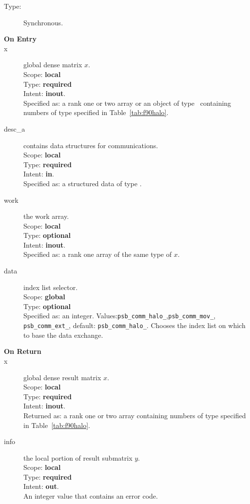 \begin{description}
\item[Type:] Synchronous.
\item[\bf On Entry]
\item[x] global dense matrix $x$.\\
Scope: {\bf local} \\
Type: {\bf required} \\
Intent: {\bf inout}.\\
Specified as:  a rank one or two array or an object of type \vdata\ 
containing numbers of type specified in
Table~\ref{tab:f90halo}.
\item[desc\_a] contains data structures for communications.\\
Scope: {\bf local} \\
Type: {\bf required}\\
Intent: {\bf in}.\\
Specified as: a structured data of type \descdata.
\item[work] the work array. \\
Scope: {\bf local} \\
Type: {\bf optional}\\
Intent: {\bf inout}.\\
Specified as: a rank one array of the same type of $x$. 
\item[data] index list selector.\\
Scope: {\bf global} \\
Type: {\bf optional} \\
Specified as: an integer. Values:\verb|psb_comm_halo_|,\verb|psb_comm_mov_|,
\verb|psb_comm_ext_|, default: \verb|psb_comm_halo_|. Chooses the
index list on which to base the data exchange. 


\item[\bf On Return] 
\item[x] global dense result matrix $x$.\\
Scope: {\bf local} \\
Type: {\bf required} \\
Intent: {\bf inout}.\\
Returned as:  a rank one or two array 
containing numbers of type specified in
Table~\ref{tab:f90halo}.
\item[info] the local portion of result submatrix $y$.\\
Scope: {\bf local} \\
Type: {\bf required} \\
Intent: {\bf out}.\\
An integer value that contains an error code. 
\end{description}
